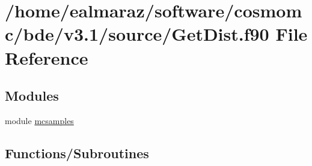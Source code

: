 \hypertarget{GetDist_8f90}{}\section{/home/ealmaraz/software/cosmomc/bde/v3.1/source/\+Get\+Dist.f90 File Reference}
\label{GetDist_8f90}
\subsection*{Modules}
\begin{DoxyCompactItemize}
\item 
module \mbox{\hyperlink{namespacemcsamples}{mcsamples}}
\end{DoxyCompactItemize}
\subsection*{Functions/\+Subroutines}
